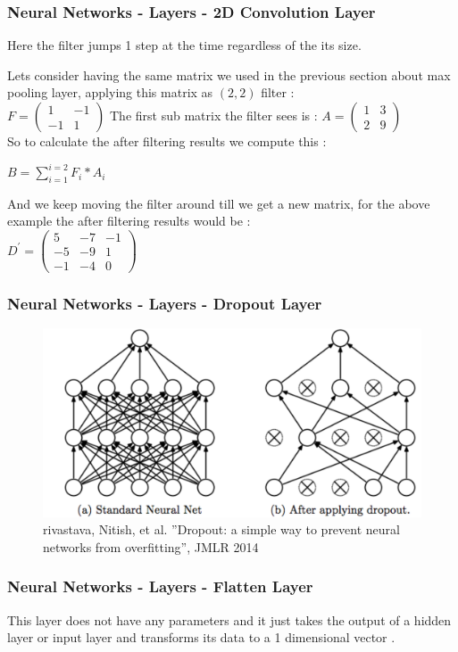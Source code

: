 \documentclass{beamer}
\begin{document}
\begin{frame}
\frametitle{Neural Networks - Layers - 2D Convolution Layer}
Here the filter jumps 1 step at the time regardless of the its size.\\
\begin{example}
Lets consider having the same matrix we used in the previous section about max pooling layer, applying this matrix as $ (2,2) $ filter :\\
$F = 
\begin{pmatrix}
1 & -1\\
-1 & 1
\end{pmatrix}
$
The first sub matrix the filter sees is : 
$A = 
\begin{pmatrix}
1 & 3\\
2 & 9
\end{pmatrix}
$\\
So to calculate the after filtering results we compute this :\\
\begin{center}
$ B = \sum_{i=1}^{i=2}F_i*A_i $
\end{center}
And we keep moving the filter around till we get a new matrix, for the above example the after filtering results would be :\\
$D^{\prime} = 
\begin{pmatrix}
5 & -7 & -1\\
-5 & -9 & 1\\
-1 & -4 & 0
\end{pmatrix}
$
\end{example}
\end{frame}

\begin{frame}
\frametitle{Neural Networks - Layers - Dropout Layer}
\begin{figure}
\centering
\includegraphics[scale=0.3]{dropout.png}
\caption{rivastava, Nitish, et al. ”Dropout: a simple way to prevent neural networks from
overfitting”, JMLR 2014}
\end{figure}
\end{frame}

\begin{frame}
\frametitle{Neural Networks - Layers - Flatten Layer}
\begin{block}{}
This layer does not have any parameters and it just takes the output of a hidden layer or input layer and transforms its data to a 1 dimensional vector .
\end{block}
\end{frame}
\end{document}
